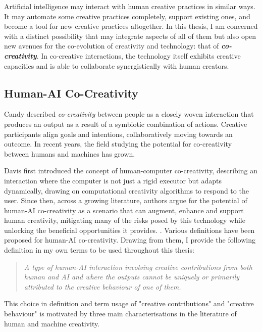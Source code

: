 Artificial intelligence may interact with human creative practices in similar ways. It may automate some creative practices completely, support existing ones, and become a tool for new creative practices altogether. In this thesis, I am concerned with a distinct possibility that may integrate aspects of all of them but also open new avenues for the co-evolution of creativity and technology: that of \textit{\textbf{co-creativity}}. In co-creative interactions, the technology itself exhibits creative capacities and is able to collaborate synergistically with human creators.

\subsection{Human-AI Co-Creativity}

Candy \cite{Candy2002-ra} described \textit{co-creativity} between people as a closely woven interaction that produces an output as a result of a symbiotic combination of actions. Creative participants align goals and intentions, collaboratively moving towards an outcome. In recent years, the field studying the potential for co-creativity between humans and machines has grown. 

Davis \cite{Davis2013-jy} first introduced the concept of human-computer co-creativity, describing an interaction where the computer is not just a rigid executor but adapts dynamically, drawing on computational creativity algorithms to respond to the user. Since then, across a growing literature, authors argue for the potential of human-AI co-creativity as a scenario that can augment, enhance and support human creativity, mitigating many of the risks posed by this technology while unlocking the beneficial opportunities it provides.  \cite{Yannakakis2014-zs,Kantosalo2020-zf,Rezwana2022-gg,Moruzzi2024-cq,Haase2024-yp,Lin2023-zq,Karimi2018-wi,Vinchon2023-gh}. Various definitions have been proposed for human-AI co-creativity. Drawing from them, I provide the following definition in my own terms to be used throughout this thesis: 

\begin{quote}
\emph{A type of human-AI interaction involving creative contributions from both human and AI and where the outputs cannot be uniquely or primarily attributed to the creative behaviour of one of them.}
\end{quote}


This choice in definition and term usage of "creative contributions" and "creative behaviour" is motivated by three main characterisations in the literature of human and machine creativity. 

